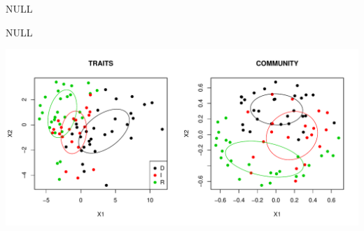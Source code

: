 \documentclass[12pt]{article}
\begin{document}
\begin{Schunk}
\begin{Soutput}
NULL
\end{Soutput}
\begin{Soutput}
NULL
\end{Soutput}
\end{Schunk}
\includegraphics{plc-003}
\end{document}
